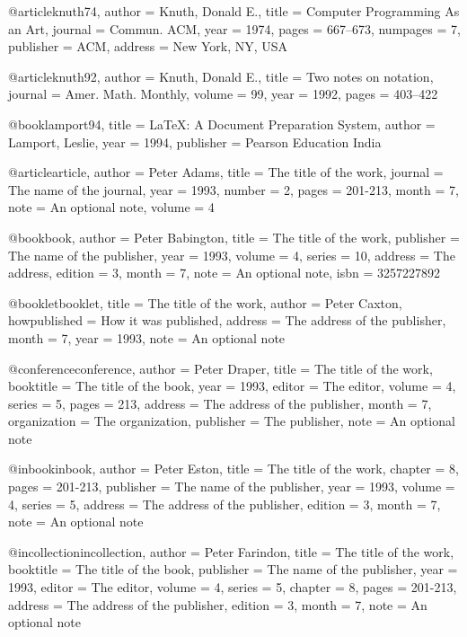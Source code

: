 @article{knuth74,
    author = {Knuth, Donald E.},
    title = {Computer Programming As an Art},
    journal = {Commun. ACM},
    year = {1974},
    pages = {667--673},
    numpages = {7},
    publisher = {ACM},
    address = {New York, NY, USA}
}

@article{knuth92,
    author = {Knuth, Donald E.},
    title = {Two notes on notation},
    journal = {Amer. Math. Monthly},
    volume = {99},
    year = {1992},
    pages = {403--422}
}

@book{lamport94,
    title = {LaTeX: A Document Preparation System},
    author = {Lamport, Leslie},
    year = {1994},
    publisher = {Pearson Education India}
}

@article{article,
  author  = {Peter Adams}, 
  title   = {The title of the work},
  journal = {The name of the journal},
  year    = 1993,
  number  = 2,
  pages   = {201-213},
  month   = 7,
  note    = {An optional note}, 
  volume  = 4
}

@book{book,
  author    = {Peter Babington}, 
  title     = {The title of the work},
  publisher = {The name of the publisher},
  year      = 1993,
  volume    = 4,
  series    = 10,
  address   = {The address},
  edition   = 3,
  month     = 7,
  note      = {An optional note},
  isbn      = {3257227892}
}

@booklet{booklet,
  title        = {The title of the work},
  author       = {Peter Caxton}, 
  howpublished = {How it was published},
  address      = {The address of the publisher},
  month        = 7,
  year         = 1993,
  note         = {An optional note}
}

@conference{conference,
  author       = {Peter Draper}, 
  title        = {The title of the work},
  booktitle    = {The title of the book},
  year         = 1993,
  editor       = {The editor},
  volume       = 4,
  series       = 5,
  pages        = 213,
  address      = {The address of the publisher},
  month        = 7,
  organization = {The organization},
  publisher    = {The publisher},
  note         = {An optional note}  
}

@inbook{inbook,
  author       = {Peter Eston}, 
  title        = {The title of the work},
  chapter      = 8,
  pages        = {201-213},
  publisher    = {The name of the publisher},
  year         = 1993,
  volume       = 4,
  series       = 5,
  address      = {The address of the publisher},
  edition      = 3,
  month        = 7,
  note         = {An optional note}
}

@incollection{incollection,
  author       = {Peter Farindon}, 
  title        = {The title of the work},
  booktitle    = {The title of the book},
  publisher    = {The name of the publisher},
  year         = 1993,
  editor       = {The editor},
  volume       = 4,
  series       = 5,
  chapter      = 8,
  pages        = {201-213},
  address      = {The address of the publisher},
  edition      = 3,
  month        = 7,
  note         = {An optional note}
}

